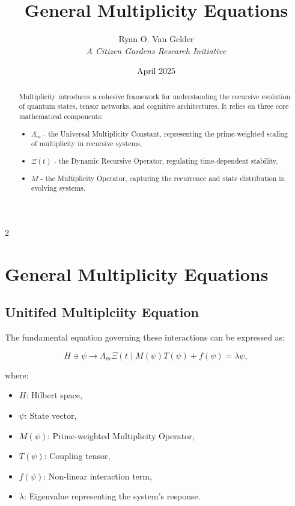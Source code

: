 \documentclass[12pt]{article}
\title{General Multiplicity Equations}
\author{Ryan O. Van Gelder \\ \textit{A Citizen Gardens Research Initiative}}
\date{April 2025}
\theoremstyle{plain}
\begin{document}
\maketitle

\begin{abstract}
Multiplicity introduces a cohesive framework for understanding the recursive evolution of quantum states, tensor networks, and cognitive architectures. It relies on three core mathematical components:

\begin{itemize}
    \item \(\Lambda_m\) - the Universal Multiplicity Constant, representing the prime-weighted scaling of multiplicity in recursive systems,
    \item \(\Xi(t)\) - the Dynamic Recursive Operator, regulating time-dependent stability,
    \item \(M\) - the Multiplicity Operator, capturing the recurrence and state distribution in evolving systems.
\end{itemize}

\end{abstract}

\newpage
 \begin{multicols}{2}
\begin{singlespace}
\tableofcontents
\end{singlespace}
\end{multicols}

\section{General Multiplicity Equations}
\subsection{Unitifed Multiplciity Equation}
The fundamental equation governing these interactions can be expressed as:

\begin{equation}
H \ni \psi \rightarrow \Lambda_m \Xi(t) M(\psi) T(\psi) + f(\psi) = \lambda \psi,
\end{equation}

where:
\begin{itemize}
    \item \( H \): Hilbert space,
    \item \( \psi \): State vector,
    \item \( M(\psi) \): Prime-weighted Multiplicity Operator,
    \item \( T(\psi) \): Coupling tensor,
    \item \( f(\psi) \): Non-linear interaction term,
    \item \( \lambda \): Eigenvalue representing the system's response.
\end{itemize}
\end{document}
